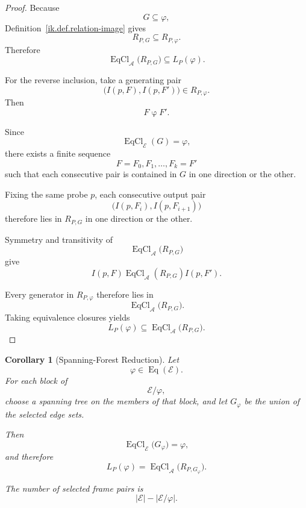 \documentclass[11pt]{article}
\theoremstyle{plain}
\newtheorem{corollary}[theorem]{Corollary}
\theoremstyle{definition}
\theoremstyle{remark}
\begin{document}
\begin{proof}
  Because
  \[
    G
    \subseteq
    \varphi,
  \]
  Definition~\ref{ik.def.relation-image}
  gives
  \[
    R_{P,G}
    \subseteq
    R_{P,\varphi}.
  \]
  Therefore
  \[
    \operatorname{EqCl}_{\mathcal{A}}
    \bigl(
    R_{P,G}
    \bigr)
    \subseteq
    L_P(\varphi).
  \]

  For the reverse inclusion,
  take a generating pair
  \[
    \bigl(
    I(p,F),
    I(p,F')
    \bigr)
    \in
    R_{P,\varphi}.
  \]
  Then
  \[
    F\mathrel{\varphi}F'.
  \]

  Since
  \[
    \operatorname{EqCl}_{\mathcal{E}}(G)
    =
    \varphi,
  \]
  there exists a finite sequence
  \[
    F
    =
    F_0,
    F_1,
    \ldots,
    F_k
    =
    F'
  \]
  such that each consecutive pair
  is contained in \(G\)
  in one direction or the other.

  Fixing the same probe \(p\),
  each consecutive output pair
  \[
    \bigl(
    I(p,F_i),
    I(p,F_{i+1})
    \bigr)
  \]
  therefore lies in \(R_{P,G}\)
  in one direction or the other.

  Symmetry and transitivity of
  \[
    \operatorname{EqCl}_{\mathcal{A}}
    \bigl(
    R_{P,G}
    \bigr)
  \]
  give
  \[
    I(p,F)
    \mathrel{
      \operatorname{EqCl}_{\mathcal{A}}
      \left(
      R_{P,G}
      \right)
    }
    I(p,F').
  \]

  Every generator in \(R_{P,\varphi}\)
  therefore lies in
  \[
    \operatorname{EqCl}_{\mathcal{A}}
    \bigl(
    R_{P,G}
    \bigr).
  \]
  Taking equivalence closures yields
  \[
    L_P(\varphi)
    \subseteq
    \operatorname{EqCl}_{\mathcal{A}}
    \bigl(
    R_{P,G}
    \bigr).
  \]
\end{proof}

\begin{corollary}[Spanning-Forest Reduction]
  \label{ik.cor.spanning-forest}
  Let
  \[
    \varphi
    \in
    \operatorname{Eq}(\mathcal{E}).
  \]
  For each block of
  \[
    \mathcal{E}/\varphi,
  \]
  choose a spanning tree on the members of that block,
  and let \(G_{\varphi}\)
  be the union of the selected edge sets.

  Then
  \[
    \operatorname{EqCl}_{\mathcal{E}}
    \bigl(
    G_{\varphi}
    \bigr)
    =
    \varphi,
  \]
  and therefore
  \[
    L_P(\varphi)
    =
    \operatorname{EqCl}_{\mathcal{A}}
    \bigl(
    R_{P,G_{\varphi}}
    \bigr).
  \]

  The number of selected frame pairs is
  \[
    |\mathcal{E}|
    -
    |\mathcal{E}/\varphi|.
  \]
\end{corollary}
\end{document}
